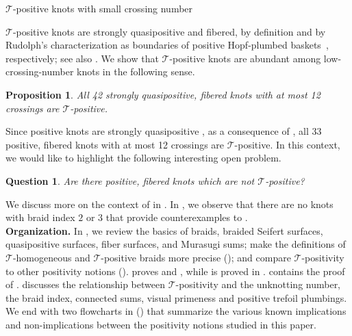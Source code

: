 \documentclass{amsart}
\makeatletter
\renewcommand\subsection{\@startsection{subsection}{2}%
  \z@{-.5\linespacing\@plus-.7\linespacing}{.5\linespacing}%
  {\normalfont\scshape}}
\theoremstyle{definition}
\theoremstyle{remark}
\theoremstyle{plain}
\newtheorem{proposition}[definition]{Proposition}
\newtheorem{question}[definition]{Question}%
\newcommand{\T}{\mathcal{T}}
\makeatother
\begin{document}
\subsection{\texorpdfstring{$\T$-positive}{T-positive} knots with small crossing number}

$\T$-positive knots are strongly quasipositive and fibered, by definition and by Rudolph's characterization as boundaries of positive Hopf-plumbed baskets~\cite{Rudolph_Hopf_plumbing}, respectively; see also . We show that $\T$-positive knots are abundant among low-crossing-number knots in the following sense. 
\begin{proposition}\label{prop:sqp_fib_12_cross}
    All 42 strongly quasipositive, fibered knots with at most 12 crossings are $\T$-positive.
\end{proposition}

Since positive knots are strongly quasipositive \cite{Rudolph_positiveLinksSQP,nakamura}, as a consequence of , all 33 positive, fibered knots with at most 12 crossings are $\T$-positive.
In this context, we would like to highlight the following interesting open problem.

\begin{question}\label{question:pos_fib_T-pos}
    Are there positive, fibered knots which are not $\mathcal{T}$-positive? %
\end{question}

We discuss more on the context of  in . In , we observe that there are no knots with braid index $2$ or $3$ that provide counterexamples to .\\

\textbf{Organization.} 
In , we review the basics of braids, braided Seifert surfaces, quasipositive surfaces, fiber surfaces, and Murasugi sums; make the definitions of $\T$-homogeneous and $\T$-positive braids more precise (); and compare $\T$-positivity to other positivity notions ().  proves  and , while  is proved in .  contains the proof of .  discusses the relationship between $\T$-positivity and the unknotting number, the braid index, connected sums, visual primeness and positive trefoil plumbings. We end with two flowcharts in  () that summarize the various known implications and non-implications between the positivity notions studied in this paper.\\
\end{document}
